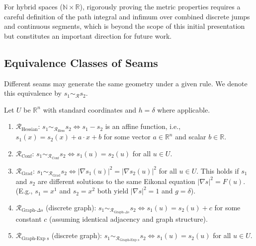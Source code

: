 \documentclass[twoside,twocolumn]{article}
\numberwithin{equation}{section} %
\begin{document}
\noindent For hybrid spaces (\( \mathbb{N} \times \mathbb{R} \)), rigorously proving the metric properties requires a careful definition of the path integral and infimum over combined discrete jumps and continuous segments, which is beyond the scope of this initial presentation but constitutes an important direction for future work.

\subsection{Equivalence Classes of Seams}

Different seams may generate the same geometry under a given rule. We denote this equivalence by \( s_1 \sim_{\mathcal{R}} s_2 \).

\begin{proposition} \label{prop:seam_equiv}
Let \( U \) be \( \mathbb{R}^n \) with standard coordinates and \( h=\delta \) where applicable.
\begin{enumerate}
    \item \( \mathcal{R}_{\text{Hessian}} \): \( s_1 \sim_{\mathcal{R}_{\text{Hess}}} s_2 \iff s_1 - s_2 \) is an affine function, i.e., \( s_1(x) = s_2(x) + a \cdot x + b \) for some vector \( a \in \mathbb{R}^n \) and scalar \( b \in \mathbb{R} \).
    \item \( \mathcal{R}_{\text{Conf}} \): \( s_1 \sim_{\mathcal{R}_{\text{Conf}}} s_2 \iff s_1(u) = s_2(u) \) for all \( u \in U \).
    \item \( \mathcal{R}_{\text{Grad}} \): \( s_1 \sim_{\mathcal{R}_{\text{Grad}}} s_2 \iff |\nabla s_1(u)|^2 = |\nabla s_2(u)|^2 \) for all \( u \in U \). This holds if \( s_1 \) and \( s_2 \) are different solutions to the same Eikonal equation \( |\nabla s|^2 = F(u) \). (E.g., \( s_1=x^1 \) and \( s_2=x^2 \) both yield \( |\nabla s|^2=1 \) and \( g=\delta \)).
    \item \( \mathcal{R}_{\text{Graph-}\Delta s} \) (discrete graph): \( s_1 \sim_{\mathcal{R}_{\text{Graph-}\Delta s}} s_2 \iff s_1(u) = s_2(u) + c \) for some constant \( c \) (assuming identical adjacency and graph structure).
    \item \( \mathcal{R}_{\text{Graph-Exp s}} \) (discrete graph): \( s_1 \sim_{\mathcal{R}_{\text{Graph-Exp s}}} s_2 \iff s_1(u) = s_2(u) \) for all \( u \in U \).
\end{enumerate}
\end{proposition}
\end{document}
